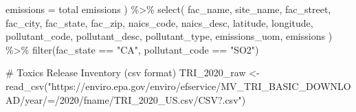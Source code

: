 \documentclass[
  letterpaper,
  DIV=11,
  numbers=noendperiod]{scrartcl}
\newenvironment{Shaded}{\begin{snugshade}}{\end{snugshade}}
\newcommand{\AttributeTok}[1]{\textcolor[rgb]{0.40,0.45,0.13}{#1}}
\newcommand{\CommentTok}[1]{\textcolor[rgb]{0.37,0.37,0.37}{#1}}
\newcommand{\FunctionTok}[1]{\textcolor[rgb]{0.28,0.35,0.67}{#1}}
\newcommand{\NormalTok}[1]{\textcolor[rgb]{0.00,0.23,0.31}{#1}}
\newcommand{\OtherTok}[1]{\textcolor[rgb]{0.00,0.23,0.31}{#1}}
\newcommand{\SpecialCharTok}[1]{\textcolor[rgb]{0.37,0.37,0.37}{#1}}
\newcommand{\StringTok}[1]{\textcolor[rgb]{0.13,0.47,0.30}{#1}}
\begin{document}
\begin{Shaded}
\begin{Highlighting}[]
    \AttributeTok{emissions =} \StringTok{\textasciigrave{}}\AttributeTok{total emissions}\StringTok{\textasciigrave{}}
\NormalTok{  ) }\SpecialCharTok{\%\textgreater{}\%}
  \FunctionTok{select}\NormalTok{(}
\NormalTok{    fac\_name,}
\NormalTok{    site\_name,}
\NormalTok{    fac\_street,}
\NormalTok{    fac\_city,}
\NormalTok{    fac\_state,}
\NormalTok{    fac\_zip,}
\NormalTok{    naics\_code,}
\NormalTok{    naics\_desc,}
\NormalTok{    latitude,}
\NormalTok{    longitude,}
\NormalTok{    pollutant\_code,}
\NormalTok{    pollutant\_desc,}
\NormalTok{    pollutant\_type,}
\NormalTok{    emissions\_uom,}
\NormalTok{    emissions}
\NormalTok{  ) }\SpecialCharTok{\%\textgreater{}\%}
  \FunctionTok{filter}\NormalTok{(fac\_state }\SpecialCharTok{==} \StringTok{"CA"}\NormalTok{,}
\NormalTok{         pollutant\_code }\SpecialCharTok{==} \StringTok{"SO2"}\NormalTok{)}

\CommentTok{\# Toxics Release Inventory (csv format)}
\NormalTok{TRI\_2020\_raw }\OtherTok{\textless{}{-}} \FunctionTok{read\_csv}\NormalTok{(}\StringTok{"https://enviro.epa.gov/enviro/efservice/MV\_TRI\_BASIC\_DOWNLOAD/year/=/2020/fname/TRI\_2020\_US.csv/CSV?.csv"}\NormalTok{)}


\end{Highlighting}
\end{Shaded}
\end{document}
